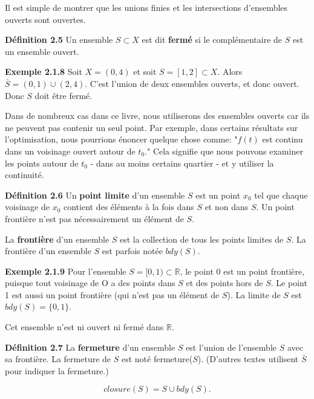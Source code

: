 \documentclass[10pt,twoside,a4paper]{book}
\begin{document}
Il est simple de montrer que les unions finies et les intersections d'ensembles ouverts sont ouvertes.

\vspace{4mm}
\noindent
\textbf{Définition 2.5} Un ensemble $S \subset X$ est dit \textbf{fermé} si le complémentaire de $S$ est un ensemble ouvert.

\vspace{4mm}
\noindent
\textbf{Exemple 2.1.8} Soit $X = (0, 4)$ et soit $S = [1, 2] \subset X$. Alors $\bar{S} = (0,1) \cup (2, 4)$. C'est l'union de deux ensembles ouverts, et donc ouvert. Donc $S$ doit être fermé.

\vspace{2mm}
Dans de nombreux cas dans ce livre, nous utiliserons des ensembles ouverts car ils ne peuvent pas contenir un seul point. Par exemple, dans certains résultats sur l'optimisation, nous pourrions énoncer quelque chose comme: "$f(t)$ est continu dans un voisinage ouvert autour de $t_0$." 
Cela signifie que nous pouvons examiner les points autour de $t_0$ - dans au moins certains quartier - et y utiliser la continuité.

\vspace{4mm}
\noindent
\textbf{Définition 2.6} Un \textbf{point limite} d'un ensemble $S$ est un point $x_0$ tel que chaque voisinage de $x_0$ contient des éléments à la fois dans $S$ et non dans $S$. Un point frontière n'est pas nécessairement un élément de $S$.

La \textbf{frontière} d'un ensemble $S$ est la collection de tous les points limites de $S$. La frontière d'un ensemble $S$ est parfois notée $bdy(S)$.

\vspace{4mm}
\noindent
\textbf{Exemple 2.1.9} Pour l'ensemble $S = [0, 1) \subset \mathbb{R}$, le point 0 est un point frontière, puisque tout voisinage de O a des points dans $S$ et des points hors de $S$. Le point 1 est aussi un point frontière (qui n'est pas un élément de $S$). La limite de $S$ est $bdy(S) = \{0, 1\}$.

Cet ensemble n'est ni ouvert ni fermé dans $\mathbb{R}$.

\vspace{4mm}
\noindent
\textbf{Définition 2.7} La \textbf{fermeture} d'un ensemble $S$ est l'union de l'ensemble $S$ avec sa frontière. La fermeture
de $S$ est noté fermeture($S$). (D'autres textes utilisent $\bar{S}$ pour indiquer la fermeture.)

\begin{equation*}
  closure(S) = S \cup bdy(S).
\end{equation*}
\end{document}
